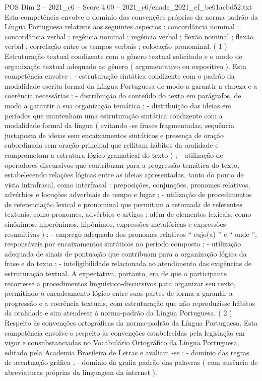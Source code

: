 \begin{textsample}{POS Dim 2 – 2021\_c6 – Score 4.00 – 2021\_c6/enade\_2021\_ef\_be61acbd52.txt}
Esta competência envolve o domínio das convenções próprias da norma padrão da Língua Portuguesa relativas aos seguintes aspectos : concordância nominal ; concordância verbal ; regência nominal ; regência verbal ; flexão nominal ; flexão verbal ; correlação entre os tempos verbais ; colocação pronominal. ( 1 ) Estruturação textual condizente com o gênero textual solicitado e o modo de organização textual adequado ao gênero ( argumentativo ou expositivo ).
Esta competência envolve : - estruturação sintática condizente com o padrão da modalidade escrita formal da Língua Portuguesa de modo a garantir a clareza e a coerência necessárias ; - distribuição do conteúdo do texto em parágrafos, de modo a garantir a sua organização temática ; - distribuição das ideias em períodos que mantenham uma estruturação sintática condizente com a modalidade formal da língua ( evitando -se frases fragmentadas, sequência justaposta de ideias sem encaixamentos sintáticos e presença de oração subordinada sem oração principal que reflitam hábitos da oralidade e comprometam a estrutura lógico-gramatical do texto ) ; - utilização de operadores discursivos que contribuam para a progressão temática do texto, estabelecendo relações lógicas entre as ideias apresentadas, tanto do ponto de vista intrafrasal, como interfrasal : preposições, conjunções, pronomes relativos, advérbios e locuções adverbiais de tempo e lugar ; - utilização de procedimentos de referenciação lexical e pronominal que permitam a retomada de referentes textuais, como pronomes, advérbios e artigos ; além de elementos lexicais, como sinônimos, hiperônimos, hipônimos, expressões metafóricas e expressões resumitivas ) ; - emprego adequado dos pronomes relativos “ cujo(a) ” e “ onde ”, responsáveis por encaixamentos sintáticos no período composto ; - utilização adequada de sinais de pontuação que contribuam para a organização lógica da frase e do texto ; - inteligibilidade relacionada ao atendimento das exigências de estruturação textual.
A expectativa, portanto, era de que o participante recorresse a procedimentos linguístico-discursivos para organizar seu texto, permitindo o encadeamento lógico entre suas partes de forma a garantir a progressão e a coerência textuais, com estruturação que não reproduzisse hábitos da oralidade e sim atendesse à norma-padrão da Língua Portuguesa. ( 2 ) Respeito às convenções ortográficas da norma-padrão da Língua Portuguesa.
Esta competência envolve o respeito às convenções estabelecidas pela legislação em vigor e consubstanciadas no Vocabulário Ortográfico da Língua Portuguesa, editado pela Academia Brasileira de Letras e avaliam -se : - domínio das regras de acentuação gráfica ; - domínio da grafia padrão das palavras ( com ausência de abreviaturas próprias da linguagem da internet ).

\end{textsample}
